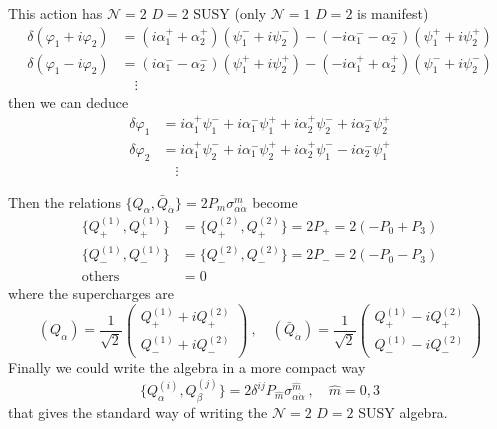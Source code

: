 \documentclass[a4paper,12pt]{article}
\numberwithin{equation}{section}
\numberwithin{exe}{section}
\newcommand{\Qb}{{\bar Q}}
\renewcommand{\a}{{\alpha}}
\newcommand{\ad}{{\dot\alpha}}
\renewcommand{\b}{{\beta}}
\renewcommand{\d}{{\delta}}
\newcommand{\s}{{\sigma}}
\newcommand{\vphi}{{\varphi}}
\begin{document}
This action has $\mathcal N=2$ $D=2$ SUSY (only $\mathcal N=1$ $D=2$ is manifest)
	\begin{equation}
		\begin{aligned}
		\d (\vphi_1 + i\vphi_2 ) & = (i\a^+_1 + \a^+_2)(\psi^-_1 + i\psi^-_2 ) - (-i\a^-_1 - \a^-_2)(\psi^+_1 + i\psi^+_2) \\
		\d (\vphi_1 - i\vphi_2 ) & = (i\a^-_1 - \a^-_2)(\psi^+_1 + i\psi^+_2 ) - (-i\a^+_1 + \a^+_2)(\psi^-_1 + i\psi^-_2) \\
		& \quad \vdots
		\end{aligned}
	\end{equation}
then we can deduce
	\begin{equation}
		\begin{aligned}
		\d \vphi_1 & = i\a^+_1 \psi^-_1 + i\a^-_1 \psi^+_1 + i\a^+_2 \psi^-_2 + i\a^-_2 \psi^+_2 \\
		\d \vphi_2 & = i\a^+_1 \psi^-_2 + i\a^-_1 \psi^+_2 + i\a^+_2 \psi^-_1 - i\a^-_2 \psi^+_1 \\
		& \quad \vdots
		\end{aligned}
	\end{equation}

Then the relations $\{Q_\a, \Qb_\ad\} = 2P_m \s^m_{\a\ad}$ become
	\begin{equation}
		\begin{aligned}
		\{ Q^{(1)}_+ , Q^{(1)}_+\} & = \{Q^{(2)}_+ ,Q^{(2)}_+\} = 2P_+ = 2(-P_0 + P_3) \\
		\{ Q^{(1)}_- , Q^{(1)}_-\} & = \{Q^{(2)}_- ,Q^{(2)}_-\} = 2P_- = 2(-P_0 - P_3) \\
		\text{others} & = 0
		\end{aligned}
	\end{equation}
where the supercharges are
	\begin{equation}
	(Q_\a) = \frac{1}{\sqrt 2} \left(
		\begin{array}{c}
		Q^{(1)}_+ + i Q^{(2)}_+ \\
		Q^{(1)}_- + i Q^{(2)}_-
		\end{array}
	\right)\ ,\quad (\Qb_\ad) = \frac{1}{\sqrt 2} \left(
		\begin{array}{c}
		Q^{(1)}_+ - i Q^{(2)}_+ \\
		Q^{(1)}_- - i Q^{(2)}_-
		\end{array}
	\right)
	\end{equation}
Finally we could write the algebra in a more compact way
	\begin{equation}\label{extalg2d}
	\{ Q_\a^{(i)} , Q^{(j)}_\b\} = 2 \d^{ij} P_{\hat m} \s^{\hat m}_{\a\ad}\ ,\quad \hat m = 0,3
	\end{equation}
that gives the standard way of writing the $\mathcal N =2 $ $D=2$ SUSY algebra.
\end{document}
